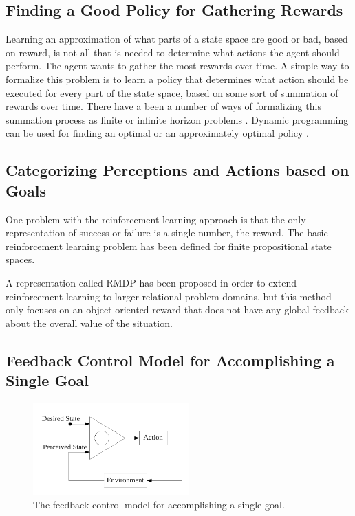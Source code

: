 \subsection{Finding a Good Policy for Gathering Rewards}

Learning an approximation of what parts of a state space are good or
bad, based on reward, is not all that is needed to determine what
actions the agent should perform.  The agent wants to gather the most
rewards over time.  A simple way to formalize this problem is to learn
a policy that determines what action should be executed for every part
of the state space, based on some sort of summation of rewards over
time.  There have a been a number of ways of formalizing this
summation process as finite or infinite horizon problems
\citep{sutton:1998}.  Dynamic programming can be used for finding an
optimal or an approximately optimal policy \citep{bertsekas:1995}.

\subsection{Categorizing Perceptions and Actions based on Goals}

One problem with the reinforcement learning approach is that the only
representation of success or failure is a single number, the reward.
The basic reinforcement learning problem has been defined for finite
propositional state spaces.

A representation called \ac{RMDP} has been proposed
\citep{guestrin:2003} in order to extend reinforcement learning to
larger relational problem domains, but this method only focuses on an
object-oriented reward that does not have any global feedback about
the overall value of the situation.


\subsection{Feedback Control Model for Accomplishing a Single Goal}

\begin{figure}[bth]
  \center
  \includegraphics[width=6cm]{gfx/feedback_control}
  \caption[The feedback control model for accomplishing a single goal]{The feedback control model for accomplishing a single goal.}
  \label{fig:feedback_control}
\end{figure}

